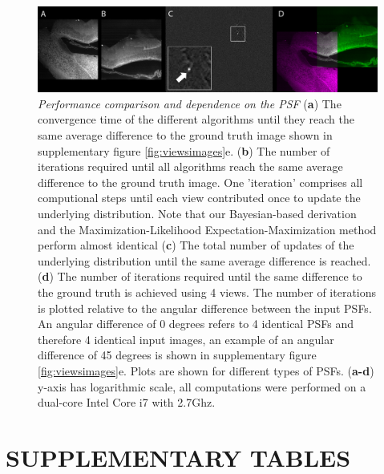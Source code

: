 \documentclass[]{spie}  %
\newcommand\fig{supplementary figure }
\begin{document}
\begin{figure}[h!]
\includegraphics[width=\textwidth]{fig-stitching.png}
\vspace{-2.0mm}
\caption{\hspace{-0.5mm}\emph{Performance comparison and dependence on the PSF} (\textbf{a}) The convergence time of the different algorithms until they reach the same average difference to the ground truth image shown in \fig \ref{fig:viewsimages}e. (\textbf{b}) The number of iterations required until all algorithms reach the same average difference to the ground truth image. One 'iteration' comprises all computional steps until each view contributed once to update the underlying distribution. Note that our Bayesian-based derivation and the Maximization-Likelihood Expectation-Maximization\cite{Shepp1982} method perform almost identical (\textbf{c}) The total number of updates of the underlying distribution until the same average difference is reached. (\textbf{d}) The number of iterations required until the same difference to the ground truth is achieved using 4 views. The number of iterations is plotted relative to the angular difference between the input PSFs. An angular difference of 0 degrees refers to 4 identical PSFs and therefore 4 identical input images, an example of an angular difference of 45 degrees is shown in \fig \ref{fig:viewsimages}e. Plots are shown for different types of PSFs. (\textbf{a-d}) y-axis has logarithmic scale, all computations were performed on a dual-core Intel Core i7 with 2.7Ghz.
}\label{fig:stitching}
\end{figure}

\pagebreak



\section*{SUPPLEMENTARY TABLES}
\end{document}
